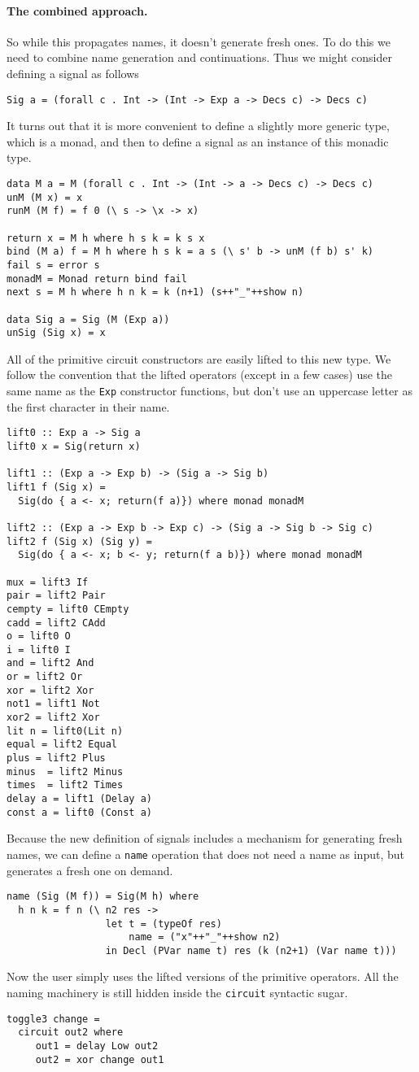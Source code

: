 \documentclass[10pt,twoside]{article}
\begin{document}
\paragraph{The combined approach.} So while this propagates names, it doesn't
generate fresh ones. To do this we need to combine name generation and
continuations. Thus we might consider defining a signal as follows
\begin{verbatim}
Sig a = (forall c . Int -> (Int -> Exp a -> Decs c) -> Decs c)
\end{verbatim}
It turns out that it is more convenient to define a slightly more
generic type, which is a monad, and then to define a signal as an
instance of this monadic type.
\begin{verbatim}
data M a = M (forall c . Int -> (Int -> a -> Decs c) -> Decs c)
unM (M x) = x
runM (M f) = f 0 (\ s -> \x -> x)

return x = M h where h s k = k s x
bind (M a) f = M h where h s k = a s (\ s' b -> unM (f b) s' k)
fail s = error s
monadM = Monad return bind fail
next s = M h where h n k = k (n+1) (s++"_"++show n) 

data Sig a = Sig (M (Exp a))
unSig (Sig x) = x
\end{verbatim}
All of the primitive circuit constructors are easily lifted to this new
type. We follow the convention that the lifted operators (except in a few
cases) use the same name as the {\tt Exp} constructor functions,
but don't use an uppercase letter as the first character in their name.
\begin{verbatim}
lift0 :: Exp a -> Sig a
lift0 x = Sig(return x)

lift1 :: (Exp a -> Exp b) -> (Sig a -> Sig b)
lift1 f (Sig x) = 
  Sig(do { a <- x; return(f a)}) where monad monadM

lift2 :: (Exp a -> Exp b -> Exp c) -> (Sig a -> Sig b -> Sig c)
lift2 f (Sig x) (Sig y) = 
  Sig(do { a <- x; b <- y; return(f a b)}) where monad monadM
 
mux = lift3 If
pair = lift2 Pair
cempty = lift0 CEmpty
cadd = lift2 CAdd
o = lift0 O
i = lift0 I
and = lift2 And
or = lift2 Or
xor = lift2 Xor
not1 = lift1 Not
xor2 = lift2 Xor
lit n = lift0(Lit n)
equal = lift2 Equal
plus = lift2 Plus
minus  = lift2 Minus
times  = lift2 Times
delay a = lift1 (Delay a)
const a = lift0 (Const a)
\end{verbatim}
Because the new definition of signals includes a mechanism for generating
fresh names, we can define a {\tt name} operation that does not need
a name as input, but generates a fresh one on demand.
\begin{verbatim}
name (Sig (M f)) = Sig(M h) where
  h n k = f n (\ n2 res -> 
                 let t = (typeOf res)
                     name = ("x"++"_"++show n2)
                 in Decl (PVar name t) res (k (n2+1) (Var name t)))
\end{verbatim}
Now the user simply uses the lifted versions of the primitive operators.
All the naming machinery is still hidden inside the {\tt circuit}
syntactic sugar. 
\begin{verbatim}
toggle3 change = 
  circuit out2 where
     out1 = delay Low out2
     out2 = xor change out1
\end{verbatim}
\end{document}
